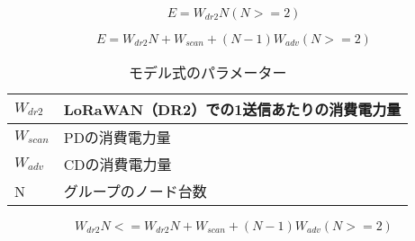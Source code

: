 \begin{equation}
    \label{fig:model_lora}
    E = W_{dr2}N (N>=2)
\end{equation}

\begin{equation}
    \label{fig:model_group}
    E = W_{dr2}N + W_{scan} + (N-1)W_{adv} (N>=2)
\end{equation}

\begin{table}[]
    \caption{モデル式のパラメーター}
    \label{fig:model_param}
    \centering
    \begin{tabular}{|l|l|}
    \hline
    $W_{dr2}$  & LoRaWAN（DR2）での1送信あたりの消費電力量 \\ \hline
    $W_{scan}$ & PDの消費電力量                   \\ \hline
    $W_{adv}$  & CDの消費電力量                   \\ \hline
    N           & グループのノード台数                 \\ \hline
    \end{tabular}
\end{table}

\begin{equation}
    \label{fig:model_lora_group}
    W_{dr2}N <= W_{dr2}N + W_{scan} + (N-1)W_{adv} (N>=2)
\end{equation}